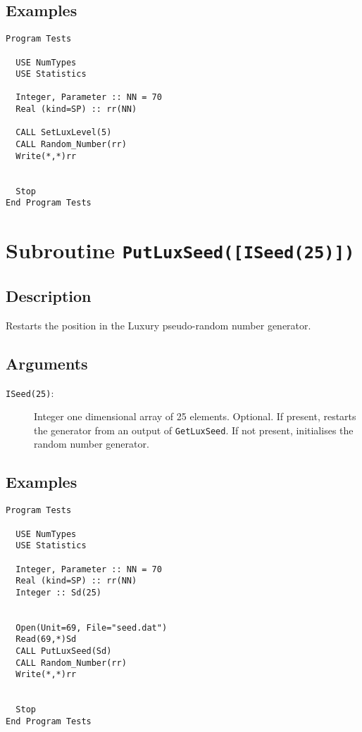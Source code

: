 \subsection{Examples}

\begin{lstlisting}[emph=SetLuxLevel,
                   emphstyle=\color{blue},
                   frame=trBL,
                   caption=Setting the Luxury level of the pseudo random number generator., 
                   label=setluxlevel]
Program Tests

  USE NumTypes 
  USE Statistics

  Integer, Parameter :: NN = 70
  Real (kind=SP) :: rr(NN)

  CALL SetLuxLevel(5)
  CALL Random_Number(rr)
  Write(*,*)rr

  
  Stop
End Program Tests
\end{lstlisting}


\section{Subroutine \texttt{PutLuxSeed([ISeed(25)])}}

\subsection{Description}

Restarts the position in the Luxury pseudo-random number generator. 

\subsection{Arguments}

\begin{description}
\item[\texttt{ISeed(25)}:] Integer one dimensional array of 25
  elements. Optional. If present, restarts the generator from an output
  of \texttt{GetLuxSeed}. If not present, initialises the random
  number generator.
\end{description}

\subsection{Examples}

\begin{lstlisting}[emph=PutLuxSeed,
                   emphstyle=\color{blue},
                   frame=trBL,
                   caption=Using a previously saved point in the generating process.,
                   label=putluxseed]
Program Tests

  USE NumTypes 
  USE Statistics

  Integer, Parameter :: NN = 70
  Real (kind=SP) :: rr(NN)
  Integer :: Sd(25)


  Open(Unit=69, File="seed.dat")
  Read(69,*)Sd
  CALL PutLuxSeed(Sd)
  CALL Random_Number(rr)
  Write(*,*)rr

  
  Stop
End Program Tests
\end{lstlisting}

